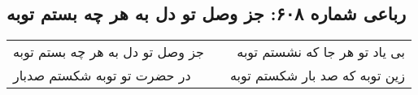 \begin{center}
\section*{رباعی شماره ۶۰۸: جز وصل تو دل به هر چه بستم توبه}
\label{sec:sh608}
\begin{longtable}{l p{0.5cm} r}
جز وصل تو دل به هر چه بستم توبه
&&
بی یاد تو هر جا که نشستم توبه
\\
در حضرت تو توبه شکستم صدبار
&&
زین توبه که صد بار شکستم توبه
\\
\end{longtable}
\end{center}
